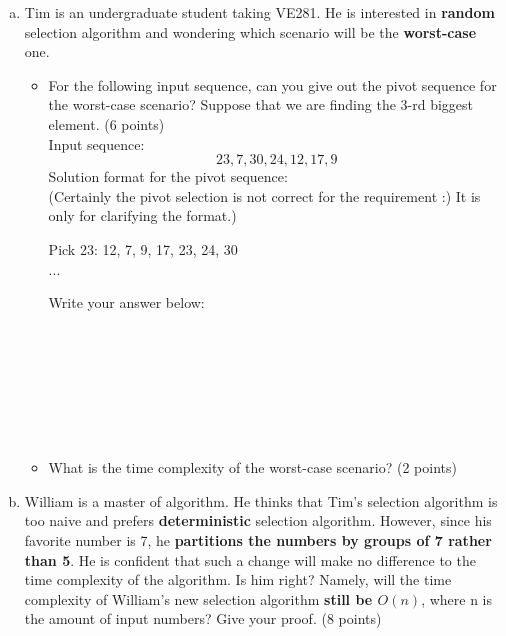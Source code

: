 \documentclass[11pt]{exam}
\begin{document}
\begin{enumerate}[(a)]
\item Tim is an undergraduate student taking VE281. He is interested in \textbf{random} selection algorithm and wondering which scenario will be the \textbf{worst-case} one.
\begin{itemize}
    \item For the following input sequence, can you give out the pivot sequence for the worst-case scenario? Suppose that we are finding the 3-rd biggest element. (6 points)\\
    Input sequence:
    $$23,7,30,24,12,17,9$$
    Solution format for the pivot sequence:\\
    (Certainly the pivot selection is not correct for the requirement :) It is only for clarifying the format.)
    \begin{solution}

    Pick 23: 12, 7, 9, 17, 23, 24, 30\\
    ...
    \end{solution}
    Write your answer below:
    \begin{solution}
        ~\\
        ~\\
        ~\\
        ~\\
        ~\\
        ~\\
    \end{solution}
\item What is the time complexity of the worst-case scenario? (2 points)
\begin{solution}
\end{solution}
\end{itemize}
\item William is a master of algorithm. He thinks that Tim's selection algorithm is too naive
and prefers \textbf{deterministic} selection algorithm. However, since his favorite number is 7,
he \textbf{partitions the numbers by groups of 7 rather than 5}. He is confident that such a change
will make no difference to the time complexity of the algorithm. Is him right? Namely, will the time
complexity of William's new selection algorithm \textbf{still be $O(n)$}, where n is the amount of
input numbers? Give your proof. (8 points)


\end{enumerate}
\end{document}
